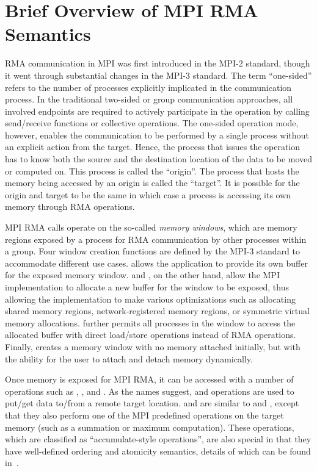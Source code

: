 \section{Brief Overview of MPI RMA Semantics}\label{sec:back}

RMA communication in MPI was first introduced in the MPI-2 standard,
though it went through substantial changes in the MPI-3 standard.  The
term ``one-sided'' refers to the number of processes explicitly
implicated in the communication process.  In the traditional two-sided
or group communication approaches, all involved endpoints are required
to actively participate in the operation by calling send\slash receive
functions or collective operations.  The one-sided operation mode,
however, enables the communication to be performed by a single process
without an explicit action from the target.  Hence, the process that
issues the operation has to know both the source and the destination
location of the data to be moved or computed on.  This process is
called the ``origin''.  The process that hosts the memory being
accessed by an origin is called the ``target''.  It is possible for
the origin and target to be the same in which case a process is
accessing its own memory through RMA operations.

MPI RMA calls operate on the so-called \textit{memory windows}, which
are memory regions exposed by a process for RMA communication by other
processes within a group.  Four window creation functions are defined
by the MPI-3 standard to accommodate different use cases.
 allows the application to provide its own buffer
for the exposed memory window.   and
, on the other hand, allow the MPI
implementation to allocate a new buffer for the window to be exposed,
thus allowing the implementation to make various optimizations such as
allocating shared memory regions, network-registered memory regions,
or symmetric virtual memory allocations.
 further permits all processes in the
window to access the allocated buffer with direct load\slash store
operations instead of RMA operations.  Finally,
 creates a memory window with no memory
attached initially, but with the ability for the user to attach and
detach memory dynamically.

Once memory is exposed for MPI RMA, it can be accessed with a number
of operations such as , ,
 and .  As the names
suggest,  and  operations are used to
put/get data to/from a remote target location.  
and  are similar to  and
, except that they also perform one of the MPI predefined
operations on the target memory (such as a summation or maximum
computation).  These operations, which are classified as
``accumulate-style operations'', are also special in that they have
well-defined ordering and atomicity semantics, details of which can be
found in~\cite{mpi30-report}.

